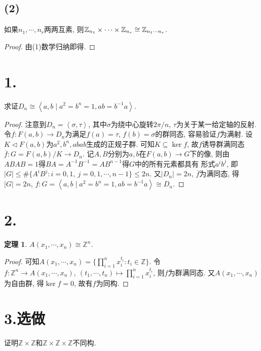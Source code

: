 \documentclass[12pt, a4paper, fontset=windows]{ctexart}
\newcommand{\Z}{\mathbb{Z}}
\newcommand{\abs}[1]{\left|{#1}\right|}
\newcommand{\cl}[1]{\overline{#1}} %
\newcommand{\gen}[1]{\left\langle{#1}\right\rangle}
\newcommand{\isom}{\cong} %
\newcommand{\xuan}{{\normalsize 选做}}
\newtheorem*{theorem}{定理}
\begin{document}
{\subsection*{(2)}

如果$n_1,\cdots,n_r$两两互素, 则$\Z_{n_1}\timess\Z_{n_r}\isom\Z_{n_1\cdots n_r}$. 

\begin{proof}
由(1)数学归纳即得. 
\end{proof}

\section*{1.}

求证$D_n\isom\gen{a,b\mid a^2=b^n=1,ab=b^{-1}a}$. 

\begin{proof}
注意到$D_n=\gen{\sigma,\tau}$, 其中$\sigma$为绕中心旋转$2\pi/n$, 
$\tau$为关于某一给定轴的反射. 令$f:F(a,b)\to D_n$为满足$f(a)=\tau$, $f(b)=\sigma$的群同态, 
容易验证$f$为满射. 设$K\lhd F(a,b)$为$a^2,b^n,abab$生成的正规子群. 
可知$K\subseteq\ker f$, 故$f$诱导群满同态$\cl{f}:G=F(a,b)/K\to D_n$. 
记$A,B$分别为$a,b$在$F(a,b)\to G$下的像, 
则由$ABAB=1$得$BA=A^{-1}B^{-1}=AB^{n-1}$得$G$中的所有元素都具有
形式$a^ib^j$, 即$\abs{G}\le\#\{A^iB^j:i=0,1,\ j=0,1,\cdots,n-1\}\le 2n$. 
又$\abs{D_n}=2n$, $\cl{f}$为满同态, 得$\abs{G}=2n$, 
$f:G=\gen{a,b\mid a^2=b^n=1,ab=b^{-1}a}\isom D_n$. 
\end{proof}

\section*{2.}

\begin{theorem}
$A(x_1,\cdots,x_n)\isom\Z^n$. 
\end{theorem}

\begin{proof}
可知$A(x_1,\cdots,x_n)=\{\prod^n_{i=1}x_i^{t_i}:t_i\in\Z\}$. 
令$f:\Z^n\to A(x_1,\cdots,x_n),\ (t_1,\cdots,t_n)\mapsto\prod^n_{i=1}x_i^{t_i}$, 
则$f$为群满同态. 又$A(x_1,\cdots,x_n)$为自由群, 得$\ker f=0$, 故有$f$为同构. 
\end{proof}

\section*{3.\xuan}

证明$\Z\times\Z$和$\Z\times\Z\times\Z$不同构. 

}
\end{document}
